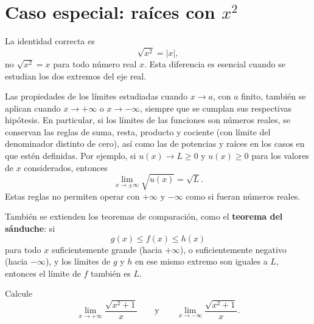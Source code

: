 \documentclass[10pt,a5paper]{article}
\newif\ifmostrarSoluciones
\begin{document}
\section*{Caso especial: raíces con $x^2$}

La identidad correcta es
\[
  \sqrt{x^2}=|x|,
\]
no $\sqrt{x^2}=x$ para todo número real $x$. Esta diferencia es esencial cuando se estudian los dos extremos del eje real.

\begin{nota}
Las propiedades de los límites estudiadas cuando $x\to a$, con $a$ finito, también se aplican cuando $x\to+\infty$ o $x\to-\infty$, siempre que se cumplan sus respectivas hipótesis. En particular, si los límites de las funciones son números reales, se conservan las reglas de suma, resta, producto y cociente (con límite del denominador distinto de cero), así como las de potencias y raíces en los casos en que estén definidas. Por ejemplo, si $u(x)\to L\geq0$ y $u(x)\geq0$ para los valores de $x$ considerados, entonces
\[
  \lim_{x\to\pm\infty}\sqrt{u(x)}=\sqrt{L}.
\]
Estas reglas no permiten operar con $+\infty$ y $-\infty$ como si fueran números reales.

También se extienden los teoremas de comparación, como el \textbf{teorema del sánduche}: si
\[
  g(x)\leq f(x)\leq h(x)
\]
para todo $x$ suficientemente grande (hacia $+\infty$), o suficientemente negativo (hacia $-\infty$), y los límites de $g$ y $h$ en ese mismo extremo son iguales a $L$, entonces el límite de $f$ también es $L$.
\end{nota}

\begin{ejemplo}
Calcule
\[
  \lim_{x\to+\infty}\frac{\sqrt{x^2+1}}{x}
  \qquad\text{y}\qquad
  \lim_{x\to-\infty}\frac{\sqrt{x^2+1}}{x}.
\]
\end{ejemplo}
\ifmostrarSoluciones
\begin{solucion}
Factorizamos $x^2$ dentro de la raíz:
\[
  \frac{\sqrt{x^2+1}}{x}
  =\frac{\sqrt{x^2\left(1+1/x^2\right)}}{x}
  =\frac{|x|}{x}\sqrt{1+\frac{1}{x^2}}.
\]
Si $x\to+\infty$, entonces $|x|/x=1$; si $x\to-\infty$, entonces $|x|/x=-1$. Por tanto,
\[
  \lim_{x\to+\infty}\frac{\sqrt{x^2+1}}{x}=1,
  \qquad
  \lim_{x\to-\infty}\frac{\sqrt{x^2+1}}{x}=-1.
\]
La gráfica tiene dos asíntotas horizontales: $y=1$ hacia la derecha y $y=-1$ hacia la izquierda.
\end{solucion}
\else\vspace{22mm}\fi
\end{document}
